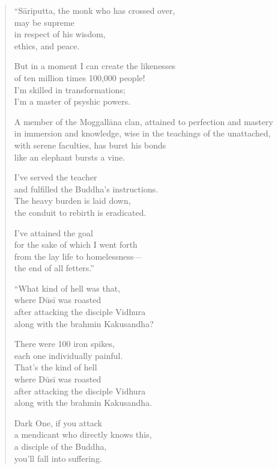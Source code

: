 \documentclass[12pt,openany]{book}%
\begin{document}
\begin{verse}
“\textsanskrit{Sāriputta}, the monk who has crossed over, \\
may be supreme \\
in respect of his wisdom, \\
ethics, and peace. 

But in a moment I can create the likenesses \\
of ten million times 100,000 people! \\
I’m skilled in transformations; \\
I’m a master of psyshic powers. 

A member of the \textsanskrit{Moggallāna} clan, attained to perfection and mastery \\
in immersion and knowledge, wise in the teachings of the unattached, \\
with serene faculties, has burst his bonds \\
like an elephant bursts a vine. 

I’ve served the teacher \\
and fulfilled the Buddha’s instructions. \\
The heavy burden is laid down, \\
the conduit to rebirth is eradicated. 

I’ve attained the goal \\
for the sake of which I went forth \\
from the lay life to homelessness—\\
the end of all fetters.” 

“What kind of hell was that, \\
where \textsanskrit{Dūsī} was roasted \\
after attacking the disciple Vidhura \\
along with the brahmin Kakusandha? 

There were 100 iron spikes, \\
each one individually painful. \\
That’s the kind of hell \\
where \textsanskrit{Dūsī} was roasted \\
after attacking the disciple Vidhura \\
along with the brahmin Kakusandha. 

Dark One, if you attack \\
a mendicant who directly knows this, \\
a disciple of the Buddha, \\
you’ll fall into suffering. 


\end{verse}
\end{document}
